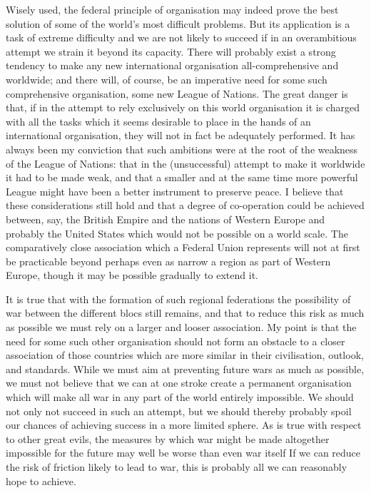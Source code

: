 \documentclass[11pt,openany]{book}
\begin{document}
Wisely used, the federal principle of organisation may indeed prove the best solution of some of the world's most difficult problems. But its application is a task of extreme difficulty and we are not likely to succeed if in an overambitious attempt we strain it beyond its capacity. There will probably exist a strong tendency to make any new international organisation all-comprehensive and worldwide; and there will, of course, be an imperative need for some such comprehensive organisation, some new League of Nations. The great danger is that, if in the attempt to rely exclusively on this world organisation it is charged with all the tasks which it seems desirable to place in the hands of an international organisation, they will not in fact be adequately performed. It has always been my conviction that such ambitions were at the root of the weakness of the League of Nations: that in the (unsuccessful) attempt to make it worldwide it had to be made weak, and that a smaller and at the same time more powerful League might have been a better instrument to preserve peace. I believe that these considerations still hold and that a degree of co-operation could be achieved between, say, the British Empire and the nations of Western Europe and probably the United States which would not be possible on a world scale. The comparatively close association which a Federal Union represents will not at first be practicable beyond perhaps even as narrow a region as part of Western Europe, though it may be possible gradually to extend it.

It is true that with the formation of such regional federations the possibility of war between the different blocs still remains, and that to reduce this risk as much as possible we must rely on a larger and looser association. My point is that the need for some such other organisation should not form an obstacle to a closer association of those countries which are more similar in their civilisation, outlook, and standards. While we must aim at preventing future wars as much as possible, we must not believe that we can at one stroke create a permanent organisation which will make all war in any part of the world entirely impossible. We should not only not succeed in such an attempt, but we should thereby probably spoil our chances of achieving success in a more limited sphere. As is true with respect to other great evils, the measures by which war might be made altogether impossible for the future may well be worse than even war itself If we can reduce the risk of friction likely to lead to war, this is probably all we can reasonably hope to achieve.
\end{document}
